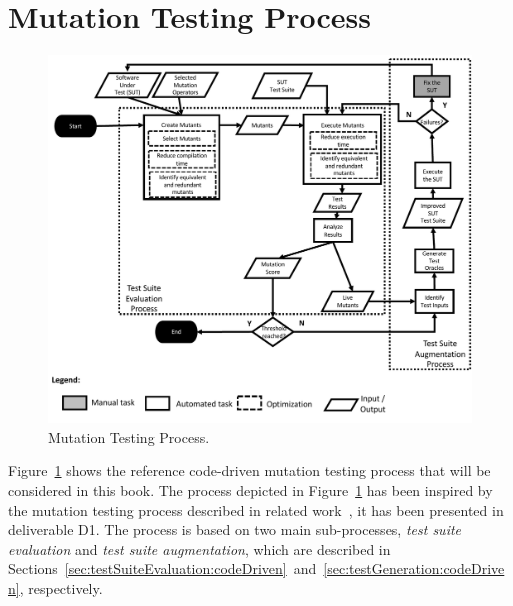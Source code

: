 
\section{Mutation Testing Process}
\label{sec:process}

	\begin{figure}
	\centering
		\includegraphics[width=\textwidth]{images/process}
		\caption{Mutation Testing Process.}
		\label{fig:code:process}
	\end{figure}

Figure~\ref{fig:code:process} shows the reference code-driven mutation testing process that will be considered in this book. The process depicted in Figure~\ref{fig:code:process} has been inspired by the mutation testing process described in related work~\cite{offutt2001mutation,papadakis2019mutation}, it has been presented in deliverable D1. The process is based on two main sub-processes, \emph{test suite evaluation} and \emph{test suite augmentation}, which are described in Sections~\ref{sec:testSuiteEvaluation:codeDriven}~and~\ref{sec:testGeneration:codeDriven}, respectively.


\endinput

